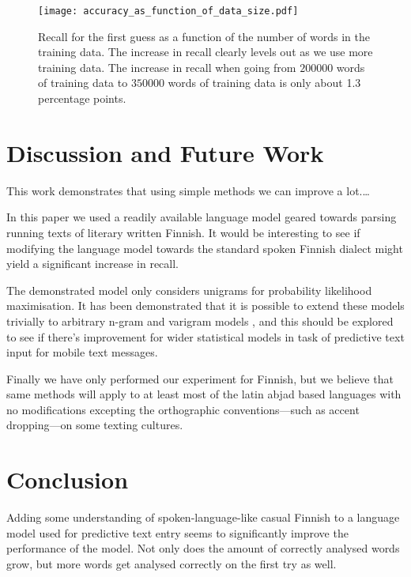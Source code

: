 \documentclass[a4paper,conference]{IEEEtran}
\begin{document}
\begin{figure}[!t]
\begin{center}
\texttt{[image: accuracy\_as\_function\_of\_data\_size.pdf]}
\end{center}
\caption{Recall for the first guess as a function of the number of words in the training data. The increase in recall clearly levels out as we use more training data. The increase in recall when going from $200000$ words of training data to $350000$ words of training data is only about 1.3 percentage points.}
\label{fig:SaturationGraph}
\end{figure}

\section{Discussion and Future Work}
\label{sec:discussion}

This work demonstrates that using simple methods we can improve a lot.\ldots

In this paper we used a readily available language model geared towards parsing
running texts of literary written Finnish. It would be interesting to see if
modifying the language model towards the standard spoken Finnish dialect
might yield a significant increase in recall.

The demonstrated model only considers unigrams for probability
likelihood maximisation. It has been demonstrated that it is possible
to extend these models trivially to arbitrary n-gram and varigram
models \cite{Silfverberg/2011}, and this should be explored to see if
there's improvement for wider statistical models in task of predictive
text input for mobile text messages.

Finally we have only performed our experiment for Finnish, but we believe that
same methods will apply to at least most of the latin abjad based languages
with no modifications excepting the orthographic conventions---such as accent
dropping---on some texting cultures.

\section{Conclusion}
\label{sec:conclusions}

Adding some understanding of spoken-language-like casual Finnish to a language model used for predictive text entry seems to significantly improve the performance of the model. Not only does the amount of correctly analysed words grow, but more words get analysed correctly on the first try as well.
\end{document}
